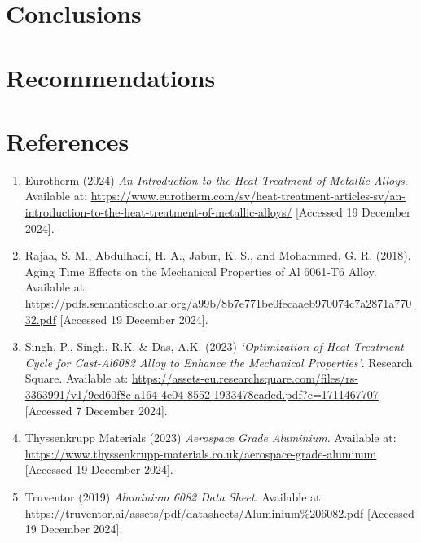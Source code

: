 \documentclass{article}
\begin{document}
    \section{Conclusions}

    \newpage\vspace*{-5pt}
    \section{Recommendations}

    \newpage\vspace*{-5pt}
    \section{References}
    \begin{enumerate}
        \item Eurotherm (2024) \textit{An Introduction to the Heat Treatment of Metallic Alloys}. Available at: \url{https://www.eurotherm.com/sv/heat-treatment-articles-sv/an-introduction-to-the-heat-treatment-of-metallic-alloys/} [Accessed 19 December 2024].
        
        \item Rajaa, S. M., Abdulhadi, H. A., Jabur, K. S., and Mohammed, G. R. (2018). Aging Time Effects on the Mechanical Properties of Al 6061-T6 Alloy. Available at: \url{https://pdfs.semanticscholar.org/a99b/8b7e771be0fecaaeb970074c7a2871a77032.pdf} [Accessed 19 December 2024].        

        \item Singh, P., Singh, R.K. \& Das, A.K. (2023) \textit{‘Optimization of Heat Treatment Cycle for Cast-Al6082 Alloy to Enhance the Mechanical Properties’}. Research Square. Available at: \url{https://assets-eu.researchsquare.com/files/rs-3363991/v1/9cd60f8c-a164-4e04-8552-1933478eaded.pdf?c=1711467707} [Accessed 7 December 2024].
        
        \item Thyssenkrupp Materials (2023) \textit{Aerospace Grade Aluminium}. Available at: \url{https://www.thyssenkrupp-materials.co.uk/aerospace-grade-aluminum} [Accessed 19 December 2024].
        
        \item Truventor (2019) \textit{Aluminium 6082 Data Sheet}. Available at: \url{https://truventor.ai/assets/pdf/datasheets/Aluminium%206082.pdf} [Accessed 19 December 2024].
        

\end{enumerate}
\end{document}

